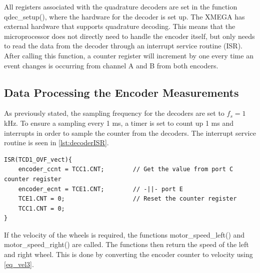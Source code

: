 All registers associated with the quadrature decoders are set in the function qdec\_setup(), where the hardware for the decoder is set up. The XMEGA has external hardware that supports quadrature decoding. This means that the microprocessor does not directly need to handle the encoder itself, but only needs to read the data from the decoder through an interrupt service routine (ISR). After calling this function, a counter register will increment by one every time an event changes is occurring from channel A and B from both encoders. 

\subsection{Data Processing the Encoder Measurements}
As previously stated, the sampling frequency for the decoders are set to $f_s = 1$ kHz. To ensure a sampling every 1 ms, a timer is set to count up 1 ms and interrupts in order to sample the counter from the decoders. The interrupt service routine is seen in \autoref{lst:decoderISR}.

\begin{lstlisting}
ISR(TCD1_OVF_vect){
	encoder_ccnt = TCC1.CNT;		// Get the value from port C counter register
	encoder_ecnt = TCE1.CNT;		// -||- port E
	TCE1.CNT = 0;					// Reset the counter register
	TCC1.CNT = 0;									
}
\end{lstlisting}
If the velocity of the wheels is required, the functions motor\_speed\_left() and motor\_speed\_right() are called. The functions then return the speed of the left and right wheel. This is done by converting the encoder counter to velocity using \autoref{eq_vel3}.

